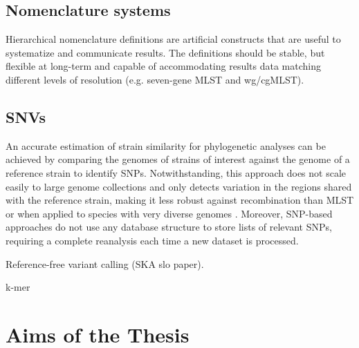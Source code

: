 \subsection{Nomenclature systems}

Hierarchical nomenclature definitions are artificial constructs that are useful to systematize and communicate results. The definitions should be stable, but flexible at long-term and capable of accommodating results data matching different levels of resolution (e.g. seven-gene MLST and wg/cgMLST).

\subsection{SNVs}

An accurate estimation of strain similarity for phylogenetic analyses can be achieved by comparing the genomes of strains of interest against the genome of a reference strain to identify \ac{SNPs}. Notwithstanding, this approach does not scale easily to large genome collections and only detects variation in the regions shared with the reference strain, making it less robust against recombination than \ac{MLST} or when applied to species with very diverse genomes \cite{jolley_bigsdb_2010}. Moreover, SNP-based approaches do not use any database structure to store lists of relevant SNPs, requiring a complete reanalysis each time a new dataset is processed.

Reference-free variant calling (SKA slo paper).

k-mer

\section{Aims of the Thesis}


